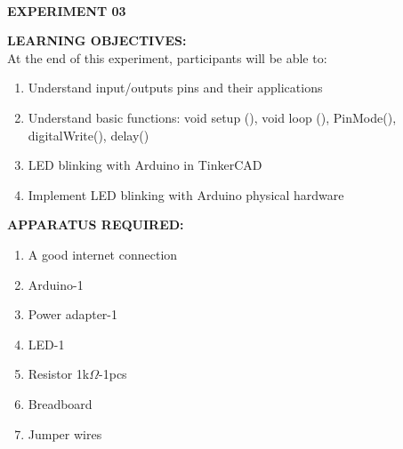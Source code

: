 \documentclass[12pt,a4paper]{article}
\begin{document}
\begin{center}

\textbf{\large \\EXPERIMENT 03 }\\[6pt]
\end{center}

\textbf{\large LEARNING OBJECTIVES:}\\[3pt]
At the end of this experiment, participants will be able to:\vspace{-6mm}\begin{enumerate}
 \setlength\itemsep{-0.3em}
\item Understand input/outputs pins and their applications
\item Understand basic functions: void setup (), void loop (), PinMode(), digitalWrite(), delay()
\item  LED blinking with Arduino in TinkerCAD
\item  Implement LED blinking with Arduino physical hardware

\end{enumerate}
\textbf{\large APPARATUS REQUIRED:}\\
\vspace{-3mm}
\begin{enumerate}
 \setlength\itemsep{-0.3em}
\item A good internet connection
\item Arduino-1
\item Power adapter-1
\item LED-1
\item Resistor 1k$\Omega$-1pcs
\item Breadboard
\item Jumper wires

\end{enumerate}
\end{document}

